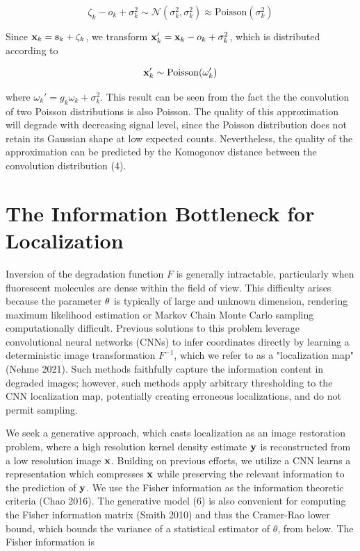 \documentclass{article}
\begin{document}
\begin{equation}
\zeta_{k} - o_{k} + \sigma_{k}^{2} \sim \mathcal{N}(\sigma_{k}^{2},\sigma_{k}^{2}) \approx \mathrm{Poisson}(\sigma_{k}^{2})
\end{equation}

Since $\bold{x}_{k} = \bold{s}_{k} + \zeta_{k}$, we transform $\bold{x}_{k}' = \bold{x}_{k} - o_{k} + \sigma_{k}^{2}$, which is distributed according to 

\begin{equation}
\bold{x}_{k}' \sim \mathrm{Poisson}(\omega_{k}')
\end{equation}

where $\omega_{k}' = g_{k}\omega_{k} + \sigma_{k}^{2}$. This result can be seen from the fact the the convolution of two Poisson distributions is also Poisson. The quality of this approximation will degrade with decreasing signal level, since the Poisson distribution does not retain its Gaussian shape at low expected counts. Nevertheless, the quality of the approximation can be predicted by the Komogonov distance between the convolution distribution (4).

\section{The Information Bottleneck for Localization}

Inversion of the degradation function $F$ is generally intractable, particularly when fluorescent molecules are dense within the field of view. This difficulty arises because the parameter $\bold{\theta}$ is typically of large and unknown dimension, rendering maximum likelihood estimation or Markov Chain Monte Carlo sampling computationally difficult. Previous solutions to this problem leverage convolutional neural networks (CNNs) to infer coordinates directly by learning a deterministic image transformation $F^{-1}$, which we refer to as a "localization map" (Nehme 2021). Such methods faithfully capture the information content in degraded images; however, such methods apply arbitrary thresholding to the CNN localization map, potentially creating erroneous localizations, and do not permit sampling. 

We seek a generative approach, which casts localization as an image restoration problem, where a high resolution kernel density estimate $\bold{y}$ is reconstructed from a low resolution image $\bold{x}$. Building on previous efforts, we utilize a CNN learns a representation which compresses $\bold{x}$ while preserving the relevant information to the prediction of $\bold{y}$. We use the Fisher information as the information theoretic criteria (Chao 2016). The generative model (6) is also convenient for computing the Fisher information matrix (Smith 2010) and thus the Cramer-Rao lower bound, which bounds the variance of a statistical estimator of $\theta$, from below. The Fisher information is
\end{document}

